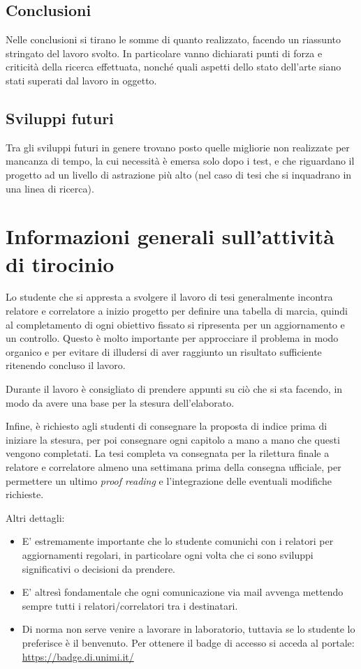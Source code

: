 \documentclass[12pt]{report}
\begin{document}
\section{Conclusioni}

Nelle conclusioni si tirano le somme di quanto realizzato, facendo un riassunto stringato del lavoro svolto. In particolare vanno dichiarati punti di forza e criticità della ricerca effettuata, nonché quali aspetti dello stato dell'arte siano stati superati dal lavoro in oggetto.

\section{Sviluppi futuri}

Tra gli sviluppi futuri in genere trovano posto quelle migliorie non realizzate per mancanza di tempo, la cui necessità è emersa solo dopo i test, e che riguardano il progetto ad un livello di astrazione più alto (nel caso di tesi che si inquadrano in una linea di ricerca).


% 
% 

\appendix

\chapter{Informazioni generali sull'attività di tirocinio}
Lo studente che si appresta a svolgere il lavoro di tesi generalmente incontra relatore e correlatore a inizio progetto per definire una tabella di marcia, quindi al completamento di ogni obiettivo fissato si ripresenta per un aggiornamento e un controllo. Questo è molto importante per approcciare il problema in modo organico e per evitare di illudersi di aver raggiunto un risultato sufficiente ritenendo concluso il lavoro.

Durante il lavoro è consigliato di prendere appunti su ciò che si sta facendo, in modo da avere una base per la stesura dell'elaborato.

Infine, è richiesto agli studenti di consegnare la proposta di indice prima di iniziare la stesura, per poi consegnare ogni capitolo a mano a mano che questi vengono completati. La tesi completa va consegnata per la rilettura finale a relatore e correlatore almeno una settimana prima della consegna ufficiale, per permettere un ultimo \textit{proof reading} e l'integrazione delle eventuali modifiche richieste.

Altri dettagli:
\begin{itemize}
    \item E' estremamente importante che lo studente comunichi con i relatori per aggiornamenti regolari, in particolare ogni volta che ci sono sviluppi significativi o decisioni da prendere.
    \item E' altresì fondamentale che ogni comunicazione via mail avvenga mettendo sempre tutti i relatori/correlatori tra i destinatari.
    \item Di norma non serve venire a lavorare in laboratorio, tuttavia se lo studente lo preferisce è il benvenuto. Per ottenere il badge di accesso si acceda al portale: \url{https://badge.di.unimi.it/}
\end{itemize}
\end{document}

